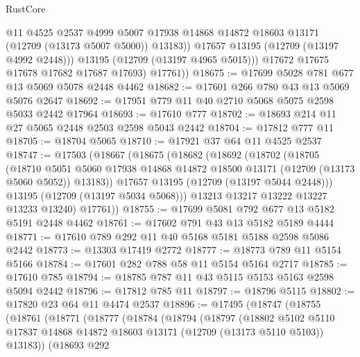\begin{lexlean}{RustCore}
\begin{coremodule}
                  @11
                  @4525
                  @2537
                  @4999
                  @5007
                  @17938
                  @14868
                  @14872
                  @18603
                  @13171
                  (@12709 (@13173 @5007 @5000))
                  @13183))
              @17657
              @13195
              (@12709 (@13197 @4992 @2448)))
            @13195
            (@12709 (@13197 @4965 @5015)))
          @17672
          @17675
          @17678
          @17682
          @17687
          @17693)
        @17761))
@18675 := @17699 @5028 @781 @677 @13 @5069 @5078 @2448 @4462
@18682 := @17601 @266 @780 @43 @13 @5069 @5076 @2647
@18692 := @17951 @779 @11 @40 @2710 @5068 @5075 @2598 @5033 @2442 @17964
@18693 := @17610 @777
@18702 := @18693 @214 @11 @27 @5065 @2448 @2503 @2598 @5043 @2442
@18704 := @17812 @777 @11
@18705 := @18704 @5065
@18710 := @17921 @37 @64 @11 @4525 @2537
@18747 := @17503
    (@18667
      (@18675
        (@18682
          (@18692
            (@18702
              (@18705
                (@18710
                  @5051
                  @5060
                  @17938
                  @14868
                  @14872
                  @18500
                  @13171
                  (@12709 (@13173 @5060 @5052))
                  @13183))
              @17657
              @13195
              (@12709 (@13197 @5044 @2448)))
            @13195
            (@12709 (@13197 @5034 @5068)))
          @13213
          @13217
          @13222
          @13227
          @13233
          @13240)
        @17761))
@18755 := @17699 @5081 @792 @677 @13 @5182 @5191 @2448 @4462
@18761 := @17602 @791 @43 @13 @5182 @5189 @4444
@18771 := @17610 @789 @292 @11 @40 @5168 @5181 @5188 @2598 @5086 @2442
@18773 := @13303 @17419 @2772
@18777 := @18773 @789 @11 @5154 @5166
@18784 := @17601 @282 @788 @58 @11 @5154 @5164 @2717
@18785 := @17610 @785
@18794 := @18785 @787 @11 @43 @5115 @5153 @5163 @2598 @5094 @2442
@18796 := @17812 @785 @11
@18797 := @18796 @5115
@18802 := @17820 @23 @64 @11 @4474 @2537
@18896 := @17495
    (@18747
      (@18755
        (@18761
          (@18771
            (@18777
              (@18784
                (@18794
                  (@18797
                    (@18802
                      @5102
                      @5110
                      @17837
                      @14868
                      @14872
                      @18603
                      @13171
                      (@12709 (@13173 @5110 @5103))
                      @13183))
                  (@18693
                    @292

\end{coremodule}
\end{lexlean}
